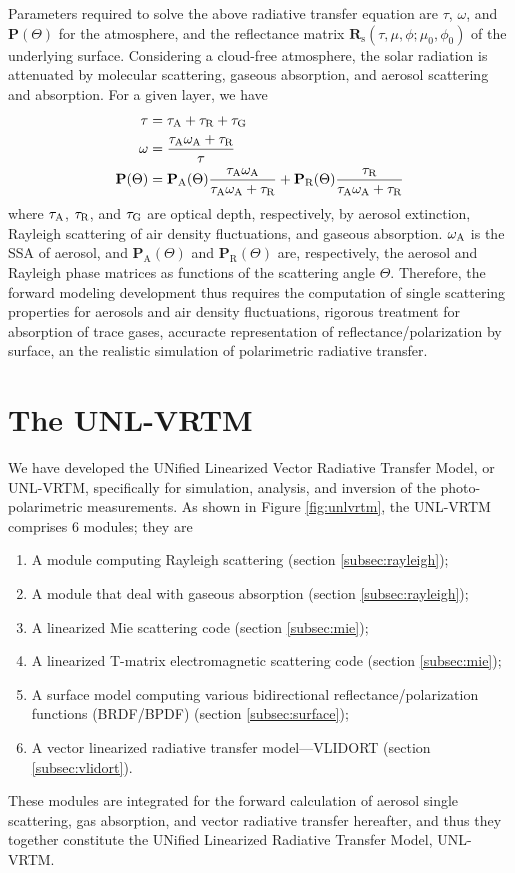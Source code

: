 Parameters required to solve the above radiative transfer equation are $\tau$,
$\omega$, and $\mathbf{P}(\Theta)$ for the atmosphere, and the reflectance
matrix $\mathbf{R}_\text{s}(\tau,\mu,\phi; \mu_0, \phi_0)$ of 
the underlying surface. Considering a cloud-free atmosphere, the solar
radiation is attenuated by molecular scattering, gaseous absorption, and
aerosol scattering and absorption. For a given layer, we have
\begin{align}
\tau   &= \tau_\text{A} + \tau_\text{R} + \tau_\text{G}  \label{eq:opt1} \\
\omega &= \frac{\tau_\text{A}\omega_\text{A} + \tau_\text{R}}{\tau} \label{eq:opt2} \\
\mathbf{P}(\Theta) &=\mathbf{P}_\text{A}(\Theta)
                     \frac{\tau_\text{A}\omega_\text{A}}{\tau_\text{A}\omega_\text{A}+\tau_\text{R}} 
                    + \mathbf{P}_\text{R}(\Theta)
                    \frac{\tau_\text{R}}{\tau_\text{A}\omega_\text{A}+\tau_\text{R}} \label{eq:opt3}
\end{align}
where $\tau_\text{A}$, $\tau_\text{R}$, and $\tau_\text{G}$ are optical depth, respectively, by 
aerosol extinction, Rayleigh scattering of air density fluctuations, 
and gaseous absorption. $\omega_\text{A}$ is the SSA of aerosol,  and
$\mathbf{P}_\text{A}(\Theta)$ and $\mathbf{P}_\text{R}(\Theta)$ are, 
respectively, the aerosol and Rayleigh phase matrices as functions of the 
scattering angle $\Theta$. Therefore, the forward modeling development 
thus requires the computation of single scattering properties for aerosols and
air density fluctuations, rigorous treatment for absorption of trace gases, 
accuracte representation of reflectance/polarization by surface, an the
realistic simulation of polarimetric radiative transfer. 

\section{The UNL-VRTM} \label{sec:unlvrtm}

We have developed the UNified Linearized Vector
Radiative Transfer Model, or UNL-VRTM, specifically for simulation,
analysis, and inversion of the photo-polarimetric measurements.
As shown in Figure \ref{fig:unlvrtm}, the UNL-VRTM comprises 6
modules; they are 
\begin{enumerate}
\item A module computing Rayleigh scattering (section
\ref{subsec:rayleigh});
\item A module that deal with gaseous absorption (section \ref{subsec:rayleigh});
\item A linearized Mie scattering code (section \ref{subsec:mie});
\item A linearized T-matrix electromagnetic scattering code (section
\ref{subsec:mie});
\item A surface model computing various bidirectional
reflectance/polarization functions (BRDF/BPDF) (section
\ref{subsec:surface});
\item A vector linearized radiative transfer model---VLIDORT (section
\ref{subsec:vlidort}). 
\end{enumerate}
These modules are integrated for the forward calculation of
aerosol single scattering, gas absorption, and vector radiative transfer
hereafter, and thus they together constitute the UNified Linearized
Radiative Transfer Model, UNL-VRTM. 

